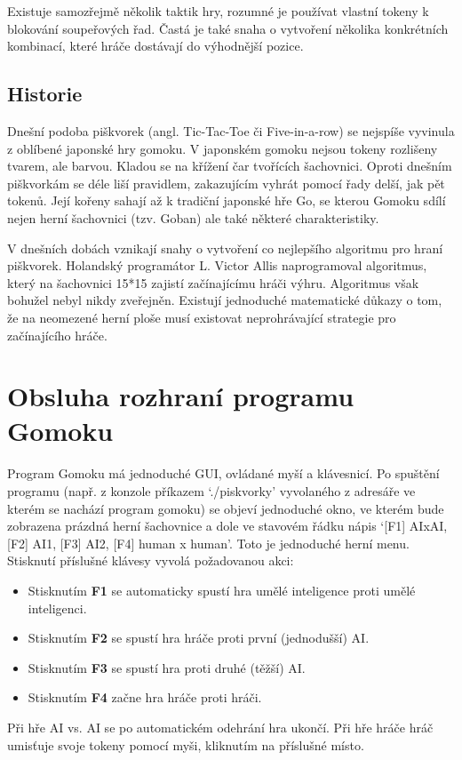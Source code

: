 \documentclass[a4paper,11pt,titlepage]{article}
\begin{document}
Existuje samozřejmě několik taktik hry, rozumné je používat vlastní tokeny k blokování soupeřových řad. Častá je také snaha o vytvoření několika konkrétních kombinací, které hráče dostávají do výhodnější pozice.
\subsection{Historie}
Dnešní podoba piškvorek (angl. Tic-Tac-Toe či Five-in-a-row) se nejspíše vyvinula z oblíbené japonské hry gomoku. V japonském gomoku nejsou tokeny rozlišeny tvarem, ale barvou. Kladou se na křížení čar tvořících šachovnici. Oproti dnešním piškvorkám se déle liší pravidlem, zakazujícím vyhrát pomocí řady delší, jak pět tokenů. Její kořeny sahají až k tradiční japonské hře Go, se kterou Gomoku sdílí nejen herní šachovnici (tzv. Goban) ale také některé charakteristiky.

V dnešních dobách vznikají snahy o vytvoření co nejlepšího algoritmu pro hraní piškvorek. Holandský programátor L. Victor Allis naprogramoval algoritmus, který na šachovnici 15*15 zajistí začínajícímu hráči výhru. Algoritmus však bohužel nebyl nikdy zveřejněn. Existují jednoduché matematické důkazy o tom, že na neomezené herní ploše musí existovat neprohrávající strategie pro začínajícího hráče.
\newpage
\section{Obsluha rozhraní programu Gomoku}
Program Gomoku má jednoduché GUI, ovládané myší a klávesnicí. Po spu\-ště\-ní programu (např. z konzole příkazem `./piskvorky' vyvolaného z adresáře ve kterém se nachází program gomoku) se objeví jednoduché okno, ve kterém bude zobrazena prázdná herní šachovnice a dole ve stavovém řádku nápis `[F1] AIxAI, [F2] AI1, [F3] AI2, [F4] human x human'. Toto je jednoduché herní menu. Stisknutí příslušné klávesy vyvolá požadovanou akci: 
\begin{itemize} 
\item Stisknutím {\bf F1} se automaticky spustí hra umělé inteligence proti umělé inteligenci. 
\item Stisknutím {\bf F2} se spustí hra hráče proti první (jednodušší) AI. 
\item Stisknutím {\bf F3} se spustí hra proti druhé (těžší) AI. 
\item Stisknutím {\bf F4} začne hra hráče proti hráči.
\end{itemize}
Při hře AI vs. AI se po automatickém odehrání hra ukončí. Při hře hráče hráč umisťuje svoje tokeny pomocí myši, kliknutím na příslušné místo.
\end{document}
